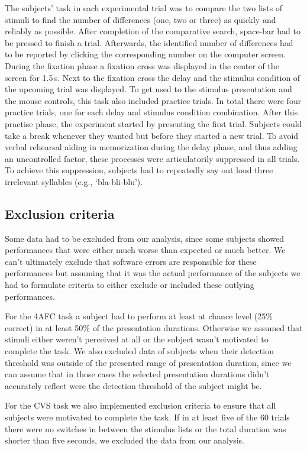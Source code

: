 The subjects’ task in each experimental trial was to compare the two lists of stimuli to find the number of differences (one, two or three) as quickly and reliably as possible.
After completion of the comparative search, space-bar had to be pressed to finish a trial. Afterwards, the identified number of differences had to be reported by clicking the corresponding number on the computer screen. 
During the fixation phase a fixation cross was displayed in the center of the screen for 1.5\,s. Next to the fixation cross the delay and the stimulus condition of the upcoming trial was displayed.
To get used to the stimulus presentation and the mouse controls, this task also included practice trials. In total there were four practice trials, one for each delay and stimulus condition combination. 
After this practise phase, the experiment started by
presenting the first trial. Subjects could take a break whenever they wanted but before they started a new trial. To avoid verbal rehearsal aiding in memorization during the delay phase, and thus adding an uncontrolled factor, these processes were articulatorily suppressed in all trials. To achieve this suppression, subjects had to repeatedly say out loud three irrelevant syllables (e.g., ‘bla-bli-blu’).


\vspace{5mm}
\subsection{Exclusion criteria}

Some data had to be excluded from our analysis, since some subjects showed performances that were either much worse than expected or much better. We can't ultimately exclude that software errors are responsible for these performances but assuming that it was the actual performance of the subjects we had to formulate criteria to either exclude or included these outlying performances. 

For the 4AFC task a subject had to perform at least at chance level (25\% correct) in at least 50\% of the presentation durations. Otherwise we assumed that stimuli either weren't perceived at all or the subject wasn't motivated to complete the task. 
We also excluded data of subjects when their detection threshold was outside of the presented range of presentation duration, since we can assume that in those cases the selected presentation durations didn't accurately reflect were the detection threshold of the subject might be.

For the CVS task we also implemented exclusion criteria to ensure that all subjects were motivated to complete the task. If in at least five of the 60 trials there were no switches in between the stimulus lists or the total duration was shorter than five seconds, we excluded the data from our analysis. 

